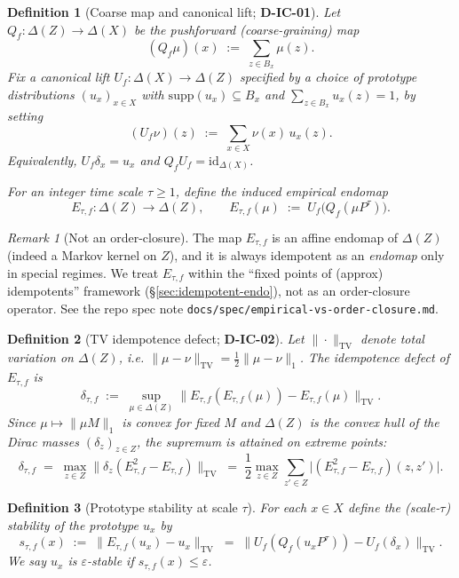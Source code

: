 \documentclass[11pt]{article}
\newtheorem{definition}{Definition}
\theoremstyle{remark}
\newtheorem{remark}{Remark}
\begin{document}
\begin{definition}[Coarse map and canonical lift; \textbf{D-IC-01}]
\label{def:D-IC-01}
Let $Q_f:\Delta(Z)\to \Delta(X)$ be the pushforward (coarse-graining) map
\[
(Q_f\mu)(x) \;:=\; \sum_{z\in B_x}\mu(z).
\]
Fix a \emph{canonical lift} $U_f:\Delta(X)\to \Delta(Z)$ specified by a choice of
\emph{prototype} distributions $(u_x)_{x\in X}$ with $\mathrm{supp}(u_x)\subseteq B_x$ and
$\sum_{z\in B_x}u_x(z)=1$, by setting
\[
(U_f\nu)(z) \;:=\; \sum_{x\in X}\nu(x)\,u_x(z).
\]
Equivalently, $U_f\delta_x=u_x$ and $Q_f U_f = \mathrm{id}_{\Delta(X)}$.

For an integer time scale $\tau\ge 1$, define the \emph{induced empirical endomap}
\[
E_{\tau,f}:\Delta(Z)\to \Delta(Z),
\qquad
E_{\tau,f}(\mu) \;:=\; U_f\bigl(Q_f(\mu P^\tau)\bigr).
\]
\end{definition}

\begin{remark}[Not an order-closure]
The map $E_{\tau,f}$ is an affine endomap of $\Delta(Z)$ (indeed a Markov kernel on $Z$),
and it is always idempotent as an \emph{endomap} only in special regimes.
We treat $E_{\tau,f}$ within the ``fixed points of (approx) idempotents'' framework
(\S\ref{sec:idempotent-endo}), not as an order-closure operator.
See the repo spec note \texttt{docs/spec/empirical-vs-order-closure.md}.
\end{remark}

\begin{definition}[TV idempotence defect; \textbf{D-IC-02}]
\label{def:D-IC-02}
Let $\|\cdot\|_{\mathrm{TV}}$ denote total variation on $\Delta(Z)$, i.e.
$\|\mu-\nu\|_{\mathrm{TV}}=\tfrac12\|\mu-\nu\|_1$.
The \emph{idempotence defect} of $E_{\tau,f}$ is
\[
\delta_{\tau,f}
\;:=\;
\sup_{\mu\in \Delta(Z)} \bigl\|E_{\tau,f}(E_{\tau,f}(\mu)) - E_{\tau,f}(\mu)\bigr\|_{\mathrm{TV}}.
\]
Since $\mu\mapsto \| \mu M\|_1$ is convex for fixed $M$ and $\Delta(Z)$ is the convex hull
of the Dirac masses $(\delta_z)_{z\in Z}$, the supremum is attained on extreme points:
\[
\delta_{\tau,f}
\;=\;
\max_{z\in Z} \bigl\|\delta_z(E_{\tau,f}^2 - E_{\tau,f})\bigr\|_{\mathrm{TV}}
\;=\;
\frac12\max_{z\in Z}\sum_{z'\in Z}\bigl|(E_{\tau,f}^2 - E_{\tau,f})(z,z')\bigr|.
\]
\end{definition}

\begin{definition}[Prototype stability at scale $\tau$]
For each $x\in X$ define the (scale-$\tau$) stability of the prototype $u_x$ by
\[
s_{\tau,f}(x) \;:=\; \bigl\|E_{\tau,f}(u_x)-u_x\bigr\|_{\mathrm{TV}}
\;=\;
\bigl\|U_f(Q_f(u_xP^\tau)) - U_f(\delta_x)\bigr\|_{\mathrm{TV}}.
\]
We say $u_x$ is \emph{$\varepsilon$-stable} if $s_{\tau,f}(x)\le \varepsilon$.
\end{definition}
\end{document}
